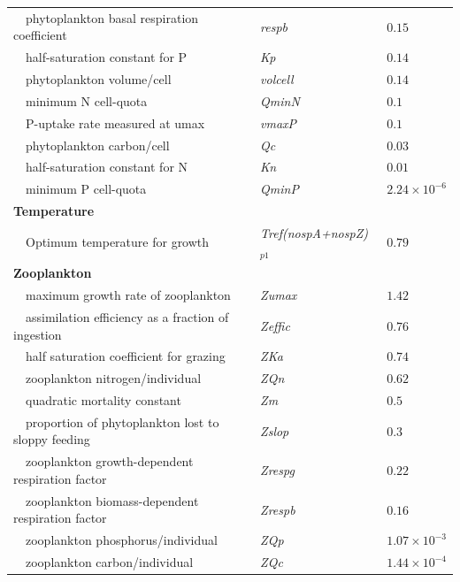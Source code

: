 \documentclass[review]{elsarticle}\usepackage[]{graphicx}\usepackage[]{color}
\begin{document}
\begin{table}[!tbp]
{\begin{center}
\begin{tabular}{lll}
~~phytoplankton basal respiration coefficient&\textit{respb}&$0.15$\tabularnewline
~~half-saturation constant for P&\textit{Kp}&$0.14$\tabularnewline
~~phytoplankton volume/cell&\textit{volcell}&$0.14$\tabularnewline
~~minimum N cell-quota&\textit{QminN}&$0.1$\tabularnewline
~~P-uptake rate measured at umax&\textit{vmaxP}&$0.1$\tabularnewline
~~phytoplankton carbon/cell&\textit{Qc}&$0.03$\tabularnewline
~~half-saturation constant for N&\textit{Kn}&$0.01$\tabularnewline
~~minimum P cell-quota&\textit{QminP}&$2.24\times 10^{-6}$\tabularnewline
\hline
{\bfseries Temperature}&&\tabularnewline
~~Optimum temperature for growth&\textit{Tref(nospA+nospZ)$_{p1}$}&$0.79$\tabularnewline
\hline
{\bfseries Zooplankton}&&\tabularnewline
~~maximum growth rate of zooplankton&\textit{Zumax}&$1.42$\tabularnewline
~~assimilation efficiency as a fraction of ingestion&\textit{Zeffic}&$0.76$\tabularnewline
~~half saturation coefficient for grazing&\textit{ZKa}&$0.74$\tabularnewline
~~zooplankton nitrogen/individual&\textit{ZQn}&$0.62$\tabularnewline
~~quadratic mortality constant&\textit{Zm}&$0.5$\tabularnewline
~~proportion of phytoplankton lost to sloppy feeding&\textit{Zslop}&$0.3$\tabularnewline
~~zooplankton growth-dependent respiration factor&\textit{Zrespg}&$0.22$\tabularnewline
~~zooplankton biomass-dependent respiration factor&\textit{Zrespb}&$0.16$\tabularnewline
~~zooplankton phosphorus/individual&\textit{ZQp}&$1.07\times 10^{-3}$\tabularnewline
~~zooplankton carbon/individual&\textit{ZQc}&$1.44\times 10^{-4}$\tabularnewline
\hline
\end{tabular}\end{center}}
\end{table}
\end{document}
